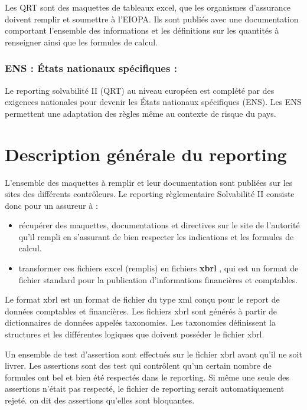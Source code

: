 Les QRT sont des maquettes de tableaux excel, que les organismes d'assurance doivent remplir et soumettre à l'EIOPA. Ils sont publiés avec une documentation comportant l'ensemble des informations et les définitions sur les quantités à renseigner ainsi que les formules de calcul.

\subsubsection*{ENS :  États nationaux spécifiques : }
Le reporting solvabilité II (QRT) au niveau européen est complété par des exigences nationales pour devenir les États nationaux spécifiques (ENS). Les ENS permettent une adaptation des règles même au contexte de risque du pays.

\section{Description générale du reporting} 
 
L'ensemble des maquettes à remplir et leur documentation sont publiées sur les sites des différents contrôleurs. Le reporting règlementaire Solvabilité II consiste donc pour un assureur à :

\begin{itemize}
\item récupérer des maquettes, documentations et directives sur le site de l'autorité qu'il rempli en s'assurant de bien respecter les indications et les formules de calcul.
\item transformer ces fichiers excel (remplis) en fichiers \textbf{xbrl} , qui est un format de fichier standard pour la publication d'informations financières et comptables.
\end{itemize}

Le format xbrl est un format de fichier du type xml conçu pour le report de données comptables et financières. Les fichiers xbrl sont générés à partir de dictionnaires de données appelés taxonomies. Les  taxonomies définissent la structures et les différentes logiques que doivent posséder le fichier xbrl.

Un ensemble de test d'assertion sont effectués sur le fichier xbrl avant qu'il ne soit livrer. Les assertions sont des test qui contrôlent qu'un certain nombre de formules ont bel et bien été respectés dans le reporting. Si même une seule des assertions n'était pas respecté, le fichier de reporting serait automatiquement rejeté. on dit des assertions qu'elles sont bloquantes.

